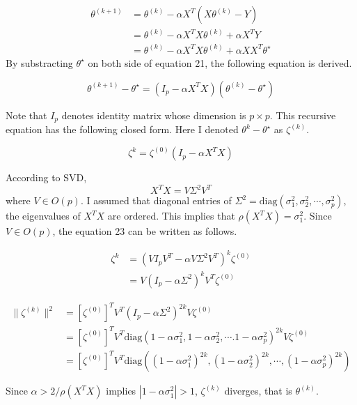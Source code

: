 \documentclass[10pt]{article}
\begin{document}
\begin{align}
    \theta^{(k+1)} &= \theta^{(k)}  - \alpha X^T(X\theta^{(k)}- Y) \\
    &= \theta^{(k)} - \alpha X^TX\theta^{(k)} + \alpha X^TY \\
    &= \theta^{(k)} - \alpha X^TX\theta^{(k)} + \alpha XX^T \theta^\star
\end{align}
By substracting $\theta^\star$ on both side of equation 21, the following equation is derived.

\begin{equation}
    \theta^{(k+1)} - \theta^\star = (I_p - \alpha X^TX)(\theta^{(k)} - \theta^\star)
\end{equation}

Note that $I_p$ denotes identity matrix whose dimension is $p \times p$. This recursive equation has the following closed form. Here I denoted $\theta^{k} - \theta^{\star}$ as $\zeta^{(k)}$.

\begin{equation}
    \zeta^{k} = \zeta^{(0)}(I_p - \alpha X^TX) 
\end{equation}

According to SVD, 
\begin{equation}
    X^TX = V\Sigma^2V^T
\end{equation}
where $V \in O(p)$. I assumed that diagonal entries of $\Sigma^2 = \text{diag}(\sigma_1^2, \sigma_2^2, \cdots, \sigma_p^2)$, the eigenvalues of $X^TX$ are ordered. 
This implies that $\rho(X^TX) = \sigma_1^2$. Since $V \in O(p)$, the equation 23 can be written as follows.

\begin{align}
    \zeta^{k} &= \left(VI_pV^T - \alpha V\Sigma^2V^T\right)^k\zeta^{(0)} \\
    &= V(I_p - \alpha \Sigma^2)^kV^T \zeta^{(0)}
\end{align}

\begin{align}
    \lVert\zeta^{(k)}\rVert^2 &= [\zeta^{(0)}]^TV^T (I_p - \alpha\Sigma^2)^{2k}V\zeta^{(0)} \\
    &= [\zeta^{(0)}]^TV^T \text{diag}(1 - \alpha \sigma_1^2, 1 - \alpha \sigma_2^2, \cdots. 1 - \alpha \sigma_p^2)^{2k} V\zeta^{(0)} \\
    &= [\zeta^{(0)}]^TV^T \text{diag}((1-\alpha \sigma_1^2)^{2k}, (1-\alpha \sigma_2^2)^{2k}, \cdots, (1-\alpha \sigma_p^2)^{2k})
\end{align}

Since $\alpha > 2/\rho(X^TX)$ implies $\left|1-\alpha \sigma_1^2\right|>1$, $\zeta^{(k)}$ diverges, that is $\theta^{(k)}$.
\end{document}
